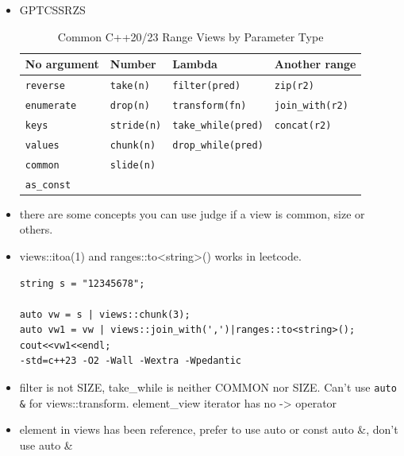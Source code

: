 \documentclass[a4paper,11pt,twoside]{book}
\begin{document}
\begin{itemize}
	The other twos are chrono\_literals; and std::string\_view\_literals;

	\item GPTCSSRZS 
	
	
\begin{table}[ht]
\centering
\begin{tabular}{|l|l|l|l|}
\hline
\textbf{No argument} & \textbf{Number} & \textbf{Lambda} & \textbf{Another range} \\ \hline
\texttt{reverse}     & \texttt{take(n)}         & \texttt{filter(pred)}       & \texttt{zip(r2)}        \\ \hline
\texttt{enumerate}   & \texttt{drop(n)}         & \texttt{transform(fn)}      & \texttt{join\_with(r2)} \\ \hline
\texttt{keys}        & \texttt{stride(n)}       & \texttt{take\_while(pred)}  & \texttt{concat(r2)}     \\ \hline
\texttt{values}      & \texttt{chunk(n)}        & \texttt{drop\_while(pred)}  &                         \\ \hline
\texttt{common}      & \texttt{slide(n)}        &                             &                         \\ \hline
\texttt{as\_const}   &                          &                             &                         \\ \hline
\end{tabular}
\caption{Common C++20/23 Range Views by Parameter Type}
\label{tab:range_views}
\end{table}	
	
	\item there are some concepts you can use judge if a view is common, size or others. 
	
	\item views::itoa(1) and ranges::to<string>() works in leetcode.
\begin{lstlisting}
string s = "12345678";

auto vw = s | views::chunk(3);
auto vw1 = vw | views::join_with(',')|ranges::to<string>();
cout<<vw1<<endl;
-std=c++23 -O2 -Wall -Wextra -Wpedantic	
\end{lstlisting}	
	
	\item filter is not SIZE, take\_while is neither COMMON nor SIZE. Can't use \texttt{auto \&} for views::transform. element\_view iterator has no -> operator
	
	\item element in views has been reference, prefer to use auto or const auto \&, don't use auto \&	
	

\end{itemize}
\end{document}
